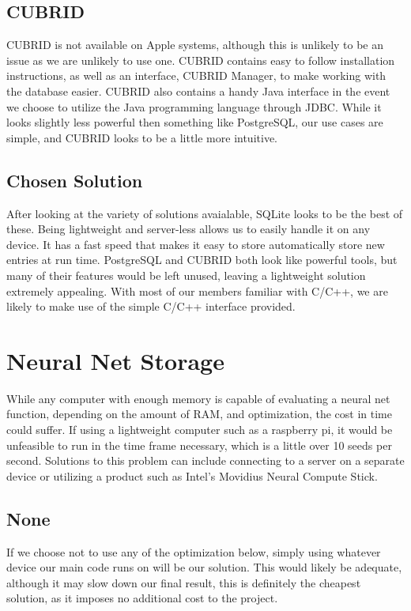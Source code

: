 \documentclass[onecolumn, draftclsnofoot,10pt, compsoc]{IEEEtran}
\begin{document}
\subsection{CUBRID}
CUBRID is not available on Apple systems, although this is unlikely to be an issue as we are unlikely to use one. CUBRID contains easy to follow installation instructions, as well as an interface, CUBRID Manager, to make working with the database easier. \cite{cubrid} CUBRID also contains a handy Java interface in the event we choose to utilize the Java programming language through JDBC. \cite{cubrid} While it looks slightly less powerful then something like PostgreSQL, our use cases are simple, and CUBRID looks to be a little more intuitive.
\subsection{Chosen Solution}
After looking at the variety of solutions avaialable, SQLite looks to be the best of these. Being lightweight and server-less allows us to easily handle it on any device. It has a fast speed that makes it easy to store automatically store new entries at run time. PostgreSQL and CUBRID both look like powerful tools, but many of their features would be left unused, leaving a lightweight solution extremely appealing. With most of our members familiar with C/C++, we are likely to make use of the simple C/C++ interface provided.

\section{Neural Net Storage}

While any computer with enough memory is capable of evaluating a neural net function, depending on the amount of RAM, and optimization, the cost in time could suffer. If using a lightweight computer such as a raspberry pi, it would be unfeasible to run in the time frame necessary, which is a little over 10 seeds per second. Solutions to this problem can include connecting to a server on a separate device or utilizing a product such as Intel's Movidius Neural Compute Stick. 
\subsection{None}
If we choose not to use any of the optimization below, simply using whatever device our main code runs on will be our solution. This would likely be adequate, although it may slow down our final result, this is definitely the cheapest solution, as it imposes no additional cost to the project.
\end{document}
